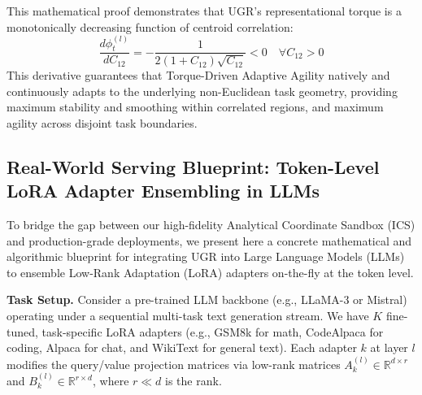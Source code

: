 \documentclass{article}
\theoremstyle{plain}
\theoremstyle{definition}
\theoremstyle{remark}
\begin{document}
This mathematical proof demonstrates that UGR's representational torque is a monotonically decreasing function of centroid correlation:
\begin{equation}
\frac{d\phi_t^{(l)}}{dC_{12}} = -\frac{1}{2 (1+C_{12}) \sqrt{C_{12}}} < 0 \quad \forall C_{12} > 0
\end{equation}
This derivative guarantees that Torque-Driven Adaptive Agility natively and continuously adapts to the underlying non-Euclidean task geometry, providing maximum stability and smoothing within correlated regions, and maximum agility across disjoint task boundaries.

\subsection{Real-World Serving Blueprint: Token-Level LoRA Adapter Ensembling in LLMs}
\label{appendix:llm_blueprint}
To bridge the gap between our high-fidelity Analytical Coordinate Sandbox (ICS) and production-grade deployments, we present here a concrete mathematical and algorithmic blueprint for integrating UGR into Large Language Models (LLMs) to ensemble Low-Rank Adaptation (LoRA) adapters on-the-fly at the token level.

\textbf{Task Setup.} Consider a pre-trained LLM backbone (e.g., LLaMA-3 or Mistral) operating under a sequential multi-task text generation stream. We have $K$ fine-tuned, task-specific LoRA adapters (e.g., GSM8k for math, CodeAlpaca for coding, Alpaca for chat, and WikiText for general text). Each adapter $k$ at layer $l$ modifies the query/value projection matrices via low-rank matrices $A_k^{(l)} \in \mathbb{R}^{d \times r}$ and $B_k^{(l)} \in \mathbb{R}^{r \times d}$, where $r \ll d$ is the rank.
\end{document}
